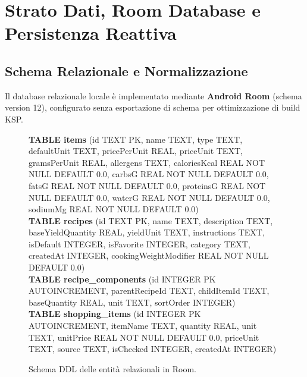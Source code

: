 \documentclass[11pt,a4paper,titlepage]{article}
\begin{document}
\newpage

\section{Strato Dati, Room Database e Persistenza Reattiva}
\subsection{Schema Relazionale e Normalizzazione}
Il database relazionale locale \`e implementato mediante \textbf{Android Room} (schema version 12), configurato senza esportazione di schema per ottimizzazione di build KSP.

\begin{figure}[h!]
    \centering
    \begin{tcolorbox}[
        enhanced,
        colback=techLightBg,
        colframe=techNavy,
        arc=2mm,
        width=0.95\textwidth,
        boxrule=1pt
    ]
        \scriptsize\ttfamily
        \textbf{TABLE items} (id TEXT PK, name TEXT, type TEXT, defaultUnit TEXT, pricePerUnit REAL, priceUnit TEXT, gramsPerUnit REAL, allergens TEXT, caloriesKcal REAL NOT NULL DEFAULT 0.0, carbsG REAL NOT NULL DEFAULT 0.0, fatsG REAL NOT NULL DEFAULT 0.0, proteinsG REAL NOT NULL DEFAULT 0.0, waterG REAL NOT NULL DEFAULT 0.0, sodiumMg REAL NOT NULL DEFAULT 0.0)\\[0.15cm]
        \textbf{TABLE recipes} (id TEXT PK, name TEXT, description TEXT, baseYieldQuantity REAL, yieldUnit TEXT, instructions TEXT, isDefault INTEGER, isFavorite INTEGER, category TEXT, createdAt INTEGER, cookingWeightModifier REAL NOT NULL DEFAULT 0.0)\\[0.15cm]
        \textbf{TABLE recipe\_components} (id INTEGER PK AUTOINCREMENT, parentRecipeId TEXT, childItemId TEXT, baseQuantity REAL, unit TEXT, sortOrder INTEGER)\\[0.15cm]
        \textbf{TABLE shopping\_items} (id INTEGER PK AUTOINCREMENT, itemName TEXT, quantity REAL, unit TEXT, unitPrice REAL NOT NULL DEFAULT 0.0, priceUnit TEXT, source TEXT, isChecked INTEGER, createdAt INTEGER)
    \end{tcolorbox}
    \caption{Schema DDL delle entit\`a relazionali in Room.}
    \label{fig:schema_room}
\end{figure}
\end{document}
